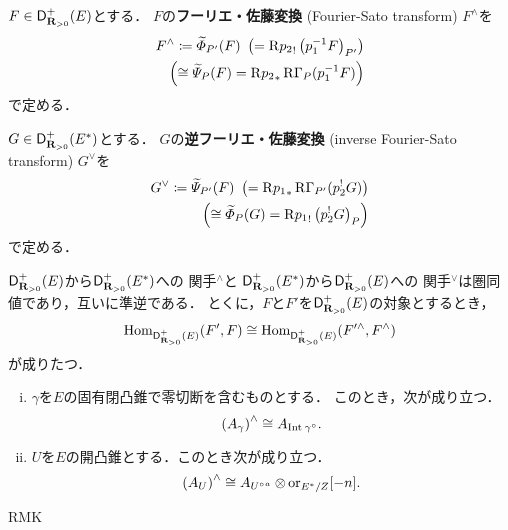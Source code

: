 \begin{DFN}[{\cite[Definition 3.7.8]{KS90}}]
    \(F\in\mathop{\mathsf{D}^{+}_{\mathbf{R}_{>0}}}\nolimits(E)\)とする．
    \(F\)の\textbf{フーリエ・佐藤変換} (Fourier-Sato transform) 
    \(F^{\wedge}\)を
    \begin{align*}
        F^{\wedge}
        \coloneqq \widetilde{\varPhi}_{P'}(F)\
        \left(=\mathrm{R}{p_2}_!\left(p_1^{-1}F\right)_{P'}\right)\\
        \left(
            \cong\widetilde{\varPsi}_{P}(F)
            =\mathrm{R}{p_2}_{\ast}\mathop{\mathrm{R}\hspace{-0pt}\Gamma}\nolimits_{P}(p_1^{-1}F)
        \right)
    \end{align*}
    で定める．

    \(G\in\mathop{\mathsf{D}^{+}_{\mathbf{R}_{>0}}}\nolimits(E^\ast)\)とする．
    \(G\)の\textbf{逆フーリエ・佐藤変換} (inverse 
    Fourier-Sato transform) \(G^{\vee}\)を
    \begin{align*}
        G^{\vee}
        \coloneqq \widetilde{\varPsi}_{P'}(F)\
        \left(=\mathrm{R}{p_1}_{\ast}\mathop{\mathrm{R}\hspace{-0pt}\Gamma}\nolimits_{P'}(p_2^{!}G)\right)\\
        \left(
            \cong \widetilde{\varPhi}_{P}(G)
            =\mathrm{R}{p_1}_!\left(p_2^{!}G\right)_{P}
        \right)
    \end{align*}
    で定める．
\end{DFN}
\begin{THM}[{\cite[Theorem 3.7.9]{KS90}}]
    \(\mathop{\mathsf{D}^{+}_{\mathbf{R}_{>0}}}\nolimits(E)\)から\(\mathop{\mathsf{D}^{+}_{\mathbf{R}_{>0}}}\nolimits(E^\ast)\)への
    関手\({}^{\wedge}\)と
    \(\mathop{\mathsf{D}^{+}_{\mathbf{R}_{>0}}}\nolimits(E^\ast)\)から\(\mathop{\mathsf{D}^{+}_{\mathbf{R}_{>0}}}\nolimits(E)\)への
    関手\({}^{\vee}\)は圏同値であり，互いに準逆である．
    とくに，\(F\)と\(F'\)を\(\mathop{\mathsf{D}^{+}_{\mathbf{R}_{>0}}}\nolimits(E)\)の対象とするとき，
    \[
        \mathop{\mathrm{Hom}}\nolimits_{\mathop{\mathsf{D}^{+}_{\mathbf{R}_{>0}}}\nolimits(E)}(F',F)\cong
        \mathop{\mathrm{Hom}}\nolimits_{\mathop{\mathsf{D}^{+}_{\mathbf{R}_{>0}}}\nolimits(E)}(F'^{\wedge},F^{\wedge})
    \]
    が成りたつ．
\end{THM}
\begin{LMM}[{\cite[Lemma 3.7.10]{KS90}}]
    \begin{enumerate}[(i)]
        \item \(\gamma\)を\(E\)の固有閉凸錐で零切断を含むものとする．
        このとき，次が成り立つ．\[
            \left(A_\gamma\right)^\wedge
            \cong A_{\mathop{\mathrm{Int}}\nolimits_{}{\gamma^\circ}}.
        \]
        \item \(U\)を\(E\)の開凸錐とする．このとき次が成り立つ．
        \[
            \left(A_U\right)^\wedge\cong
            A_{{U^{\circ}}^a}\tens \ori_{E^\ast/Z}[-n].
        \]
    \end{enumerate}
\end{LMM}
\begin{RMK}[{\cite[Remark 3.7.11]{KS90}}]
    RMK
\end{RMK}
